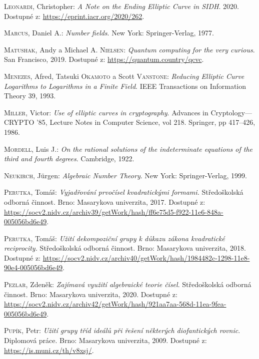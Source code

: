 \documentclass [12pt]{report}
\begin{document}
\begin{thebibliography}{97}
\textsc{Leonardi}, Christopher: \textit{A Note on the Ending Elliptic Curve in SIDH}. 2020. Dostupné z: \url{https://eprint.iacr.org/2020/262}.

\textsc{Marcus}, Daniel A.: \textit{Number fields}. New York: Springer-Verlag, 1977.

\textsc{Matushak}, Andy a Michael A. \textsc{Nielsen}: \textit{Quantum computing for the very curious}. San Francisco, 2019. Dostupné z: \url{https://quantum.country/qcvc}.

\textsc{Menezes}, Afred, Tatsuki \textsc{Okamoto} a Scott \textsc{Vanstone}: \textit{Reducing Elliptic Curve Logarithms to Logarithms in a Finite Field}. IEEE Transactions on Information Theory 39, 1993.


\textsc{Miller}, Victor: \textit{Use of elliptic curves in cryptography}. Advances in Cryptology—CRYPTO ’85, Lecture Notes in Computer Science, vol 218. Springer, pp 417–426, 1986.

\textsc{Mordell}, Luis J.: \textit{On the rational solutions of the indeterminate equations of the third and fourth degrees}. Cambridge, 1922.

\textsc{Neukirch}, J{\"u}rgen: \textit{Algebraic Number Theory}. New York: Springer-Verlag, 1999.


\textsc{Perutka}, Tomáš: \textit{Vyjadřování prvočísel kvadratickými formami.} Středoškolská odborná činnost. Brno: Masarykova univerzita, 2017. Dostupné z: \url{https://socv2.nidv.cz/archiv39/getWork/hash/ff6e75d5-f922-11e6-848a-005056bd6e49}.

\textsc{Perutka}, Tomáš: \textit{Užití dekompoziční grupy k důkazu zákona kvadratické reciprocity.} Středoškolská odborná činnost. Brno: Masarykova univerzita, 2018. Dostupné z: \url{https://socv2.nidv.cz/archiv40/getWork/hash/1984482c-1298-11e8-90e4-005056bd6e49}.


\textsc{Pezlar}, Zdeněk: \textit{Zajímavá využití algebraické teorie čísel}. Středoškolská odborná činnost. Brno: Masarykova univerzita, 2020. Dostupné z: \url{https://socv2.nidv.cz/archiv42/getWork/hash/921aa7aa-568d-11ea-9fea-005056bd6e49}.

\textsc{Pupík}, Petr: \textit{Užití grupy tříd ideálů při řešení některých diofantických rovnic}. Diplomová práce. Brno: Masarykova univerzita, 2009. Dostupné z: \url{https://is.muni.cz/th/v8xsj/}.


\end{thebibliography}
\end{document}
